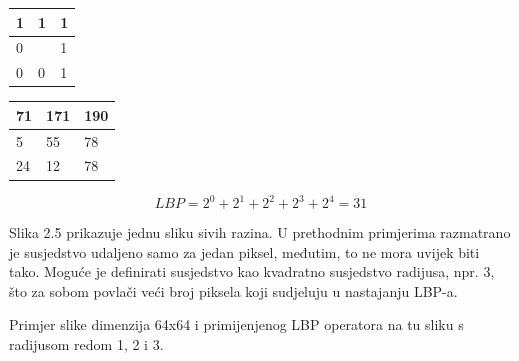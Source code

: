 \documentclass[times, utf8, zavrsni, numeric]{fer}
\begin{document}
\begin{multicols}{2}

\begin{minipage}{\linewidth}
\centering
\begin{tabularx}{0.4\textwidth}{| X | X | X |}
\hline
1 & 1 & 1 \\ 
\hline
0 &  & 1 \\ 
\hline
0 & 0 & 1 \\
\hline
\end{tabularx}
\end{minipage}

\begin{minipage}{\linewidth}
\centering
\begin{tabularx}{0.4\textwidth}{| X | X | X |}
\hline
71 & 171 & 190 \\ 
\hline
5 & 55 & 78 \\ 
\hline
24 & 12 & 78 \\
\hline
\end{tabularx}
\end{minipage}

\end{multicols}

\[LBP = 2^0 + 2^1 + 2^2 + 2^3 + 2^4 = 31\]

\bigbreak

Slika 2.5 prikazuje jednu sliku sivih razina.
U prethodnim primjerima razmatrano je susjedstvo udaljeno samo za 
jedan piksel, međutim, to ne mora uvijek biti tako. Moguće je 
definirati susjedstvo kao kvadratno susjedstvo radijusa, npr. 3, što za sobom 
povlači veći broj piksela koji sudjeluju u nastajanju LBP-a. 

\bigbreak

Primjer slike dimenzija 64x64 i primijenjenog LBP operatora na tu 
sliku s radijusom redom 1, 2 i 3.
\end{document}
